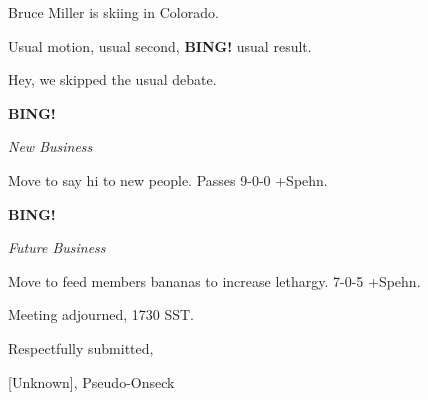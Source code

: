 \documentclass[12pt]{article}
\newcommand{\bing}{{\bf BING!} }
\newcommand{\goto}[1]{\bing \vskip 12pt \centerline{{\em{#1}}}}
\begin{document}
Bruce Miller is skiing in Colorado.

Usual motion, usual second, \bing usual result.

Hey, we skipped the usual debate.

\goto{New Business}

Move to say hi to new people. Passes 9-0-0 +Spehn.

\goto{Future Business}

Move to feed members bananas to increase lethargy. 7-0-5 +Spehn.

\vspace{12pt}

\noindent
Meeting adjourned, 1730 SST.

\vspace{18pt}

\centerline{Respectfully submitted,}
\centerline{[Unknown], Pseudo-Onseck}
\end{document}
